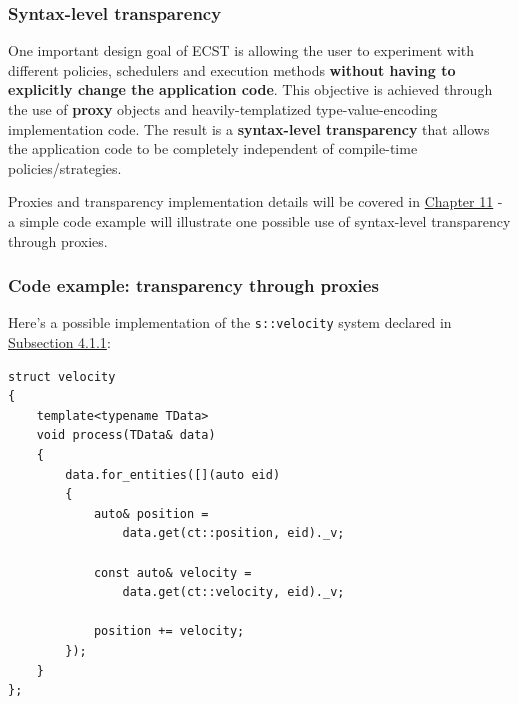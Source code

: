 \documentclass[oneside, 12pt, a4paper, openany]{book}
\begin{document}
\subsubsection{Syntax-level
transparency}\label{ecstoverview_syntaxtransp}

One important design goal of ECST is allowing the user to experiment
with different policies, schedulers and execution methods
\textbf{without having to explicitly change the application code}. This
objective is achieved through the use of \textbf{proxy} objects and
heavily-templatized type-value-encoding implementation code. The result
is a \textbf{syntax-level transparency} that allows the application code
to be completely independent of compile-time policies/strategies.

Proxies and transparency implementation details will be covered in
\protect\hyperlink{chap_proxies}{Chapter 11} - a simple code example
will illustrate one possible use of syntax-level transparency through
proxies.

\subsubsection{Code example: transparency through
proxies}\label{code-example-transparency-through-proxies}

Here's a possible implementation of the
\texttt{s::velocity}
system declared in
\protect\hyperlink{code_example_settings_definition}{Subsection 4.1.1}:

\begin{verbatim}
struct velocity
{
    template<typename TData>
    void process(TData& data)
    {
        data.for_entities([](auto eid)
        {
            auto& position =
                data.get(ct::position, eid)._v;

            const auto& velocity =
                data.get(ct::velocity, eid)._v;

            position += velocity;
        });
    }
};
\end{verbatim}
\end{document}
